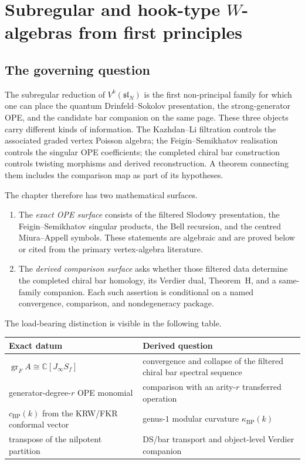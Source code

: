 
\chapter{Subregular and hook-type \texorpdfstring{$W$}{W}-algebras from first principles}
\label{chap:subregular-hook-frontier}

\section{The governing question}

The subregular reduction of $V^k(\mathfrak{sl}_N)$ is the first
non-principal family for which one can place the quantum
Drinfeld--Sokolov presentation, the strong-generator OPE, and the
candidate bar companion on the same page.  These three objects carry
different kinds of information.  The Kazhdan--Li filtration controls
the associated graded vertex Poisson algebra; the Feigin--Semikhatov
realisation controls the singular OPE coefficients; the completed
chiral bar construction controls twisting morphisms and derived
reconstruction.  A theorem connecting them includes the comparison
map as part of its hypotheses.

The chapter therefore has two mathematical surfaces.

\begin{enumerate}[label=(\roman*)]
\item The \emph{exact OPE surface} consists of the filtered Slodowy
 presentation, the Feigin--Semikhatov singular products, the Bell recursion,
 and the centred Miura--Appell symbols.  These statements are algebraic and
 are proved below or cited from the primary vertex-algebra literature.
\item The \emph{derived comparison surface} asks whether those filtered data
 determine the completed chiral bar homology, its Verdier dual, Theorem~H,
 and a same-family companion.  Each such assertion is conditional on a named
 convergence, comparison, and nondegeneracy package.
\end{enumerate}

The load-bearing distinction is visible in the following table.
\begin{center}
\renewcommand{\arraystretch}{1.2}
\begin{tabular}{ll}
\textbf{Exact datum} & \textbf{Derived question} \\
\hline
$\operatorname{gr}_F A\cong\mathbb C[J_\infty S_f]$ &
 convergence and collapse of the filtered chiral bar spectral sequence \\
generator-degree-$r$ OPE monomial &
 comparison with an arity-$r$ transferred operation \\
$c_{\mathrm{BP}}(k)$ from the KRW/FKR conformal vector &
 genus-$1$ modular curvature $\kappa_{\mathrm{BP}}(k)$ \\
transpose of the nilpotent partition &
 DS/bar transport and object-level Verdier companion
\end{tabular}
\end{center}

